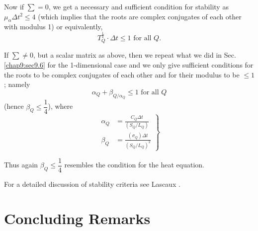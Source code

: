 Now if $\sum = 0$, we get a necessary and sufficient condition for stability as $\mu_\alpha \Delta t^2 \leq 4$ (which implies that the roots are complex conjugates of each other with modulus 1) or equivalently, 
\begin{equation*}
T^{\frac{1}{2}}_Q \cdot \Delta t \leq 1 \text{ for all } Q. \tag{11.50}\label{eq11.50}
\end{equation*}

If $\sum \neq 0$, but a scalar matrix as above, then we repeat what we did in Sec. \ref{chap9:sec9.6} for the 1-dimensional case and we only give sufficient conditions for the roots to be complex conjugates of each other and for their modulus to be $\leq 1$; namely
\begin{equation*}
\alpha_Q + \beta_{Q/\alpha_Q} \leq 1 \text{ for all } Q\tag{11.51}\label{eq11.51}
\end{equation*}
(hence $\beta_Q \leq \dfrac{1}{4}$), where 
\begin{equation*}
\left. 
\begin{aligned}
\alpha_Q & = \frac{C_Q \Delta t}{(S_Q / L_Q)}\\
\beta_Q  & = \frac{(\sigma_Q)\Delta t}{(S_Q/L_Q)^2} 
\end{aligned}
\right\}
\tag{11.52}\label{eq11.52}
\end{equation*}

Thus again $\beta_Q \leq \dfrac{1}{4}$ resembles the condition for the heat equation. 

For a detailed discussion of stability criteria see Lascaux \cite{key20}.

\section{Concluding Remarks}\label{chap11:sec11.8}

